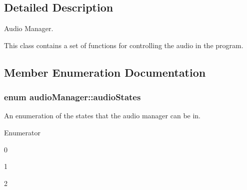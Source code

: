 \subsection{Detailed Description}
Audio Manager. 

This class contains a set of functions for controlling the audio in the program. 

\subsection{Member Enumeration Documentation}
\hypertarget{classaudio_manager_aa37cded78cf789d8931208a0c6494af2}{}
\subsubsection[{audio\+States}]{\setlength{\rightskip}{0pt plus 5cm}enum {\bf audio\+Manager\+::audio\+States}\hspace{0.3cm}{\ttfamily [strong]}}\label{classaudio_manager_aa37cded78cf789d8931208a0c6494af2}


An enumeration of the states that the audio manager can be in. 

\begin{Desc}
\item[Enumerator]\par
\begin{description}
\item[{\em 
\hypertarget{classaudio_manager_aa37cded78cf789d8931208a0c6494af2a6a216efc529825c60a4a4c0bc99ad77f}{}P\+L\+A\+Y\label{classaudio_manager_aa37cded78cf789d8931208a0c6494af2a6a216efc529825c60a4a4c0bc99ad77f}
}]0 \item[{\em 
\hypertarget{classaudio_manager_aa37cded78cf789d8931208a0c6494af2a291554596c183e837f0a6bec3767c891}{}P\+A\+U\+S\+E\label{classaudio_manager_aa37cded78cf789d8931208a0c6494af2a291554596c183e837f0a6bec3767c891}
}]1 \item[{\em 
\hypertarget{classaudio_manager_aa37cded78cf789d8931208a0c6494af2a615a46af313786fc4e349f34118be111}{}S\+T\+O\+P\label{classaudio_manager_aa37cded78cf789d8931208a0c6494af2a615a46af313786fc4e349f34118be111}
}]2 \end{description}
\end{Desc}



